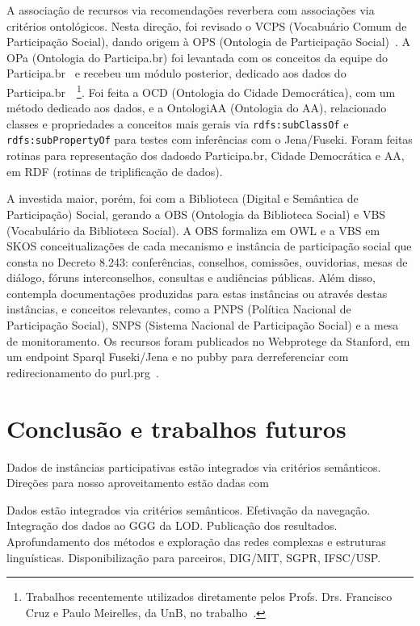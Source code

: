 \documentclass[a4paper, 11pt]{article} %
\begin{document}
A associação de recursos via recomendações reverbera com associações via critérios ontológicos. Nesta direção, foi revisado o VCPS (Vocabuário Comum de Participação Social), dando origem à OPS (Ontologia de Participação Social)~\cite{artOPS}. A OPa (Ontologia do Participa.br) foi levantada com os conceitos da equipe do Participa.br~\cite{pnud1} e recebeu um módulo posterior, dedicado aos dados do Participa.br~\cite{pnud5}~\footnote{Trabalhos recentemente utilizados diretamente pelos Profs. Drs. Francisco Cruz e Paulo Meirelles, da UnB, no trabalho~\cite{paulo6}.}. Foi feita a OCD (Ontologia do Cidade Democrática), com um método dedicado aos dados, e a OntologiAA (Ontologia do AA), relacionado classes e propriedades a conceitos mais gerais via \texttt{rdfs:subClassOf} e \texttt{rdfs:subPropertyOf} para testes com inferências com o Jena/Fuseki. Foram feitas rotinas para representação dos dadosdo Participa.br, Cidade Democrática e AA, em RDF (rotinas de triplificação de dados).

A investida maior, porém, foi com a Biblioteca (Digital e Semântica de Participação) Social, gerando a OBS (Ontologia da Biblioteca Social) e VBS (Vocabulário da Biblioteca Social). A OBS formaliza em OWL e a VBS em SKOS conceitualizações de cada mecanismo e instância de participação social que consta no Decreto 8.243: conferências, conselhos, comissões, ouvidorias, mesas de diálogo, fóruns interconselhos, consultas e audiências públicas. Além disso, contempla documentações produzidas para estas instâncias ou através destas instâncias, e conceitos relevantes, como a PNPS (Política Nacional de Participação Social), SNPS (Sistema Nacional de Participação Social) e a mesa de monitoramento. Os recursos foram publicados no Webprotege da Stanford, em um endpoint Sparql Fuseki/Jena e no pubby para derreferenciar com redirecionamento do purl.prg~\cite{pnud5}.




\section*{Conclusão e trabalhos futuros}

Dados de instâncias participativas estão integrados via critérios semânticos. Direções para nosso aproveitamento estão dadas com 

Dados estão integrados via critérios semânticos. Efetivação da navegação. Integração dos dados ao GGG da LOD. Publicação dos resultados. Aprofundamento dos métodos e exploração das redes complexas e estruturas linguísticas.
Disponibilização para parceiros, DIG/MIT, SGPR, IFSC/USP.






\end{document}
